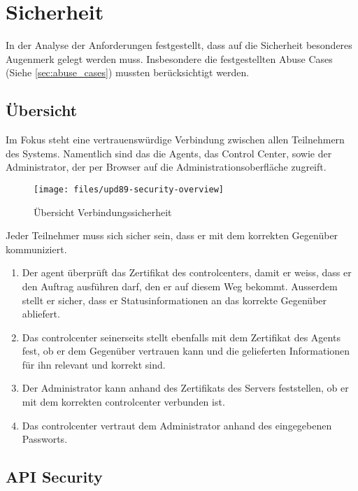 \section{Sicherheit}
\label{sec:security}

In der Analyse der Anforderungen festgestellt, dass auf die Sicherheit besonderes Augenmerk gelegt werden muss. Insbesondere die festgestellten Abuse Cases (Siehe \ref{sec:abuse_cases}) mussten berücksichtigt werden.

\subsection*{Übersicht}

Im Fokus steht eine vertrauenswürdige Verbindung zwischen allen Teilnehmern des Systems. Namentlich sind das die Agents, das Control Center, sowie der Administrator, der per Browser auf die Administrationsoberfläche zugreift.

\begin{figure}
  \centering
    \texttt{[image: files/upd89-security-overview]}
  \caption{Übersicht Verbindungssicherheit}
  \label{fig:sec-overview}
\end{figure}

Jeder Teilnehmer muss sich sicher sein, dass er mit dem korrekten Gegenüber kommuniziert.

\begin{enumerate}[label=\color{orange}\theenumi]
    \item Der \gls{agent} überprüft das Zertifikat des \glspl{controlcenter}, damit er weiss, dass er den Auftrag ausführen darf, den er auf diesem Weg bekommt. Ausserdem stellt er sicher, dass er Statusinformationen an das korrekte Gegenüber abliefert.
    \item Das \gls{controlcenter} seinerseits stellt ebenfalls mit dem Zertifikat des Agents fest, ob er dem Gegenüber vertrauen kann und die gelieferten Informationen für ihn relevant und korrekt sind.
    \item Der Administrator kann anhand des Zertifikats des Servers feststellen, ob er mit dem korrekten \gls{controlcenter} verbunden ist.
    \item Das \gls{controlcenter} vertraut dem Administrator anhand des eingegebenen Passworts.
\end{enumerate}

\subsection*{API Security}

